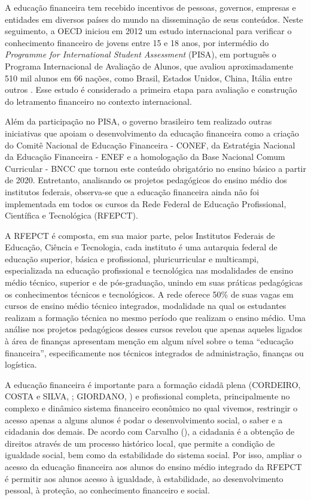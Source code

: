 A educação financeira tem recebido incentivos de pessoas, governos, empresas e entidades em diversos países do mundo na disseminação de seus conteúdos. Neste seguimento, a OECD iniciou em 2012 um estudo internacional para verificar o conhecimento financeiro de jovens entre 15 e 18 anos, por intermédio do \textit{Programme for International Student Assessment} (PISA), em português o Programa Internacional de Avaliação de Alunos, que avaliou aproximadamente 510 mil alunos em 66 nações, como Brasil, Estados Unidos, China, Itália entre outros \cite{oecd2015}. Esse estudo é considerado a primeira etapa para avaliação e construção do letramento financeiro no contexto internacional.

Além da participação no PISA, o governo brasileiro tem realizado outras iniciativas que apoiam o desenvolvimento da educação financeira como a criação do Comitê Nacional de Educação Financeira - CONEF, da Estratégia Nacional da Educação Financeira - ENEF e a homologação da Base Nacional Comum Curricular - BNCC que tornou este conteúdo obrigatório no ensino básico a partir de 2020. Entretanto, analisando os projetos pedagógicos do ensino médio dos institutos federais, observa-se que a educação financeira ainda não foi implementada em todos os cursos da Rede Federal de Educação Profissional, Científica e Tecnológica (RFEPCT).

A RFEPCT é composta, em sua maior parte, pelos Institutos Federais de Educação, Ciência e Tecnologia, cada instituto é uma autarquia federal de educação superior, básica e profissional, pluricurricular e multicampi, especializada na educação profissional e tecnológica nas modalidades de ensino médio técnico, superior e de pós-graduação, unindo em suas práticas pedagógicas os conhecimentos técnicos e tecnológicos. A rede oferece 50\% de suas vagas em cursos de ensino médio técnico integrados, modalidade na qual os estudantes realizam a formação técnica no mesmo período que realizam o ensino médio. Uma análise nos projetos pedagógicos desses cursos revelou que apenas aqueles ligados à área de finanças apresentam menção em algum nível sobre o tema “educação financeira”, especificamente nos técnicos integrados de administração, finanças ou logística. 

A educação financeira é importante para a formação cidadã plena (CORDEIRO, COSTA e SILVA, \citeauthor{cordeiro-costa-silva2018}; GIORDANO, \citeyear{giordano2020}) e profissional completa, principalmente no complexo e dinâmico sistema financeiro econômico no qual vivemos, restringir o acesso apenas a alguns alunos é podar o desenvolvimento social, o saber e a cidadania dos demais. De acordo com Carvalho (\citeyear{carvalho2010}), a cidadania é a obtenção de direitos através de um processo histórico local, que permite a condição de igualdade social, bem como da estabilidade do sistema social. Por isso, ampliar o acesso da educação financeira aos alunos do ensino médio integrado da RFEPCT é permitir aos alunos acesso à igualdade, à estabilidade, ao desenvolvimento pessoal, à proteção, ao conhecimento financeiro e social.

